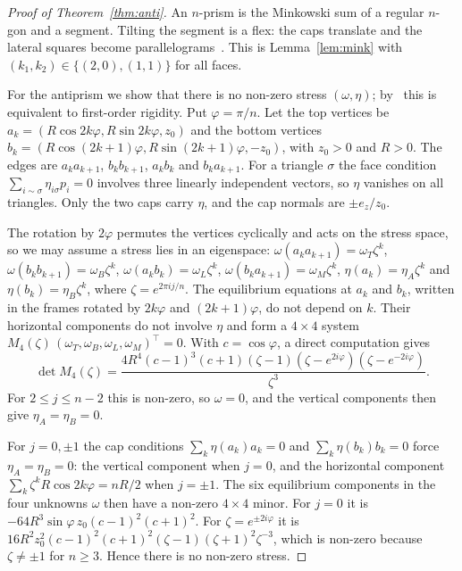 \documentclass[11pt]{amsart}
\theoremstyle{remark}
\begin{document}
\begin{proof}[Proof of Theorem~\ref{thm:anti}]
An $n$-prism is the Minkowski sum of a regular $n$-gon and a segment. Tilting the segment is a flex: the caps translate and the lateral squares become parallelograms~\cite[Sec.~4.1]{HSW2026}. This is Lemma~\ref{lem:mink} with $(k_1,k_2)\in\{(2,0),(1,1)\}$ for all faces.

For the antiprism we show that there is no non-zero stress $(\omega,\eta)$; by~\cite[Prop.~3.6]{AHWZ2026} this is equivalent to first-order rigidity. Put $\varphi=\pi/n$. Let the top vertices be $a_k=(R\cos2k\varphi,R\sin2k\varphi,z_0)$ and the bottom vertices $b_k=(R\cos(2k+1)\varphi,R\sin(2k+1)\varphi,-z_0)$, with $z_0>0$ and $R>0$. The edges are $a_ka_{k+1}$, $b_kb_{k+1}$, $a_kb_k$ and $b_ka_{k+1}$. For a triangle $\sigma$ the face condition $\sum_{i\sim\sigma}\eta_{i\sigma}p_i=0$ involves three linearly independent vectors, so $\eta$ vanishes on all triangles. Only the two caps carry $\eta$, and the cap normals are $\pm e_z/z_0$.

The rotation by $2\varphi$ permutes the vertices cyclically and acts on the stress space, so we may assume a stress lies in an eigenspace: $\omega(a_ka_{k+1})=\omega_T\zeta^k$, $\omega(b_kb_{k+1})=\omega_B\zeta^k$, $\omega(a_kb_k)=\omega_L\zeta^k$, $\omega(b_ka_{k+1})=\omega_M\zeta^k$, $\eta(a_k)=\eta_A\zeta^k$ and $\eta(b_k)=\eta_B\zeta^k$, where $\zeta=e^{2\pi ij/n}$. The equilibrium equations at $a_k$ and $b_k$, written in the frames rotated by $2k\varphi$ and $(2k+1)\varphi$, do not depend on $k$. Their horizontal components do not involve $\eta$ and form a $4\times4$ system $M_4(\zeta)\,(\omega_T,\omega_B,\omega_L,\omega_M)^\top=0$. With $c=\cos\varphi$, a direct computation gives
\[
\det M_4(\zeta)=\frac{4R^4(c-1)^3(c+1)(\zeta-1)(\zeta-e^{2i\varphi})(\zeta-e^{-2i\varphi})}{\zeta^3}.
\]
For $2\le j\le n-2$ this is non-zero, so $\omega=0$, and the vertical components then give $\eta_A=\eta_B=0$.

For $j=0,\pm1$ the cap conditions $\sum_k\eta(a_k)a_k=0$ and $\sum_k\eta(b_k)b_k=0$ force $\eta_A=\eta_B=0$: the vertical component when $j=0$, and the horizontal component $\sum_k\zeta^kR\cos2k\varphi=nR/2$ when $j=\pm1$. The six equilibrium components in the four unknowns $\omega$ then have a non-zero $4\times4$ minor. For $j=0$ it is $-64R^3\sin\varphi\,z_0(c-1)^2(c+1)^2$. For $\zeta=e^{\pm2i\varphi}$ it is $16R^2z_0^2(c-1)^2(c+1)^2(\zeta-1)(\zeta+1)^2\zeta^{-3}$, which is non-zero because $\zeta\neq\pm1$ for $n\ge3$. Hence there is no non-zero stress.
\end{proof}
\end{document}
